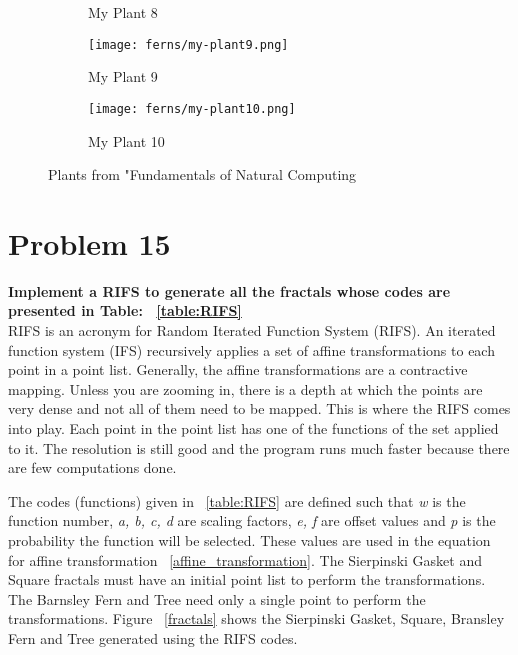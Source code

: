 \begin{figure}[tbh]
\begin{center}
\begin{subfigure}[tbh]{0.23\textwidth}
\begin{center}
	\caption{My Plant 8}
	\end{center}
	\end{subfigure}
\hfill
	\begin{subfigure}[tbh]{0.23\textwidth}
	\begin{center}
	\texttt{[image: ferns/my-plant9.png]}
	\caption{My Plant 9}
	\end{center}
	\end{subfigure}
\hfill
	\begin{subfigure}[tbh]{0.23\textwidth}
	\begin{center}
	\texttt{[image: ferns/my-plant10.png]}
	\caption{My Plant 10}
	\end{center}
	\end{subfigure}
\hfill
\end{center}
\caption{ Plants from "Fundamentals of Natural Computing}
\end{figure} \label{myPlants}

\section{Problem 15}
\textbf{ Implement a RIFS to generate all the fractals whose codes are presented in Table: ~\ref{table:RIFS} } \\
\newline
RIFS is an acronym for Random Iterated Function System (RIFS). An iterated function system (IFS) recursively applies a set of affine transformations to each point in a point list. Generally, the affine transformations are a contractive mapping.  Unless you are zooming in, there is a depth at which the points are very dense and not all of them need to be mapped. This is where the RIFS comes into play. Each point in the point list has one of the functions of the set applied to it. The resolution is still good and the program runs much faster because there are few computations done. 

The codes (functions) given in ~\ref{table:RIFS} are defined such that \textit{w} is the function number, \textit{a, b, c, d} are scaling factors, \textit{e, f} are offset values and \textit{p} is the probability the function will be selected. These values are used in the equation for affine transformation ~\ref{affine_transformation}. The Sierpinski Gasket and Square fractals must have an initial point list to perform the transformations. The Barnsley Fern and Tree need only a single point to perform the transformations. Figure ~\ref{fractals} shows the Sierpinski Gasket, Square, Bransley Fern and Tree generated using the RIFS codes. 

